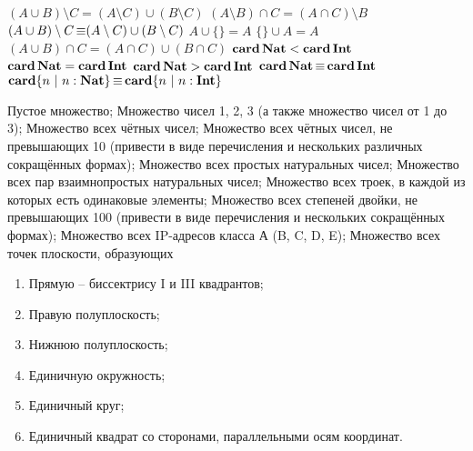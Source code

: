 \z $(A \cup B) \setminus C = (A \setminus C) \cup (B \setminus C)$
\z $(A \setminus B) \cap C = (A \cap C) \setminus B$
\z $(A \cup B) \setminus C \mathop{\equiv} (A \setminus C) \cup (B \setminus C)$
\z $A \cup \{\} = A$
\z $\{\} \cup A = A$
\z $(A \cup B) \cap C = (A \cap C) \cup (B \cap C)$
\z $\mathop{\textbf{card}} \textbf{Nat} < \mathop{\textbf{card}} \textbf{Int}$
\z $\mathop{\textbf{card}} \textbf{Nat} = \mathop{\textbf{card}} \textbf{Int}$
\z $\mathop{\textbf{card}} \textbf{Nat} > \mathop{\textbf{card}} \textbf{Int}$
\z $\mathop{\textbf{card}} \textbf{Nat} \mathop{\equiv} \mathop{\textbf{card}} \textbf{Int}$
\z $\mathop{\textbf{card}} \{n ~|~ n:\textbf{Nat}\} \mathop{\equiv} \mathop{\textbf{card}} \{n ~|~ n:\textbf{Int}\}$



\z Пустое множество;
\z Множество чисел 1, 2, 3 (а также множество чисел от 1 до 3);
\z Множество всех чётных чисел;
\z Множество всех чётных чисел, не превышающих 10 (привести в виде перечисления и нескольких различных сокращённых формах);
\z Множество всех простых натуральных чисел;
\z Множество всех пар взаимнопростых натуральных чисел;
\z Множество всех троек, в каждой из которых есть одинаковые элементы;
\z Множество всех степеней двойки, не превышающих 100 (привести в виде перечисления и нескольких сокращённых формах);
\z Множество всех IP-адресов класса А (B, C, D, E);
\z Множество всех точек плоскости, образующих
    \begin{enumerate}
    \item Прямую -- биссектрису I и III квадрантов;
    \item Правую полуплоскость;
    \item Нижнюю полуплоскость;
    \item Единичную окружность;
    \item Единичный круг;
    \item Единичный квадрат со сторонами, параллельными осям
    координат.
    \end{enumerate}

%
%


